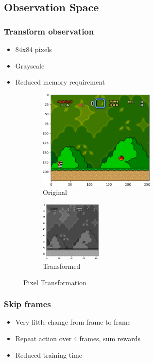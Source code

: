 \documentclass{article}
\begin{document}
    \subsection{Observation Space}
    \subsubsection{Transform observation}
    \begin{itemize}
        \item 84x84 pixels
        \item Grayscale
        \item Reduced memory requirement
    \end{itemize}
    \begin{figure}[H]
        \centering
        \begin{subfigure}{.5\textwidth}
            \centering
            \includegraphics[height=5cm]{original_crop}
            \caption{Original}
            \label{fig:sub1}
        \end{subfigure}%
        \begin{subfigure}{.5\textwidth}
            \centering
            \includegraphics[height=3cm]{grayscale_crop}
            \caption{Transformed}
            \label{fig:sub2}
        \end{subfigure}
        \caption{Pixel Transformation}
        \label{fig:transformation}
    \end{figure}
    \subsubsection{Skip frames}
    \begin{itemize}
        \item Very little change from frame to frame
        \item Repeat action over 4 frames, sum rewards
        \item Reduced training time
    \end{itemize}
\end{document}

